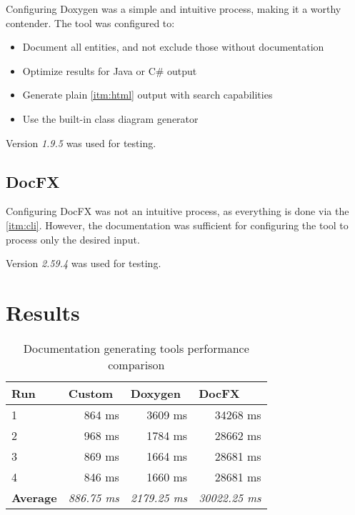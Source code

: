 Configuring Doxygen was a simple and intuitive process, making it a worthy contender. The tool was configured to:
\begin{itemize}
    \item Document all entities, and not exclude those without documentation
    \item Optimize results for Java or C\# output
    \item Generate plain \ref{itm:html} output with search capabilities
    \item Use the built-in class diagram generator
\end{itemize}

Version \textit{1.9.5} was used for testing.

\subsection{DocFX}

Configuring DocFX was not an intuitive process, as everything is done via the \ref{itm:cli}. However, the documentation was sufficient for configuring the tool to process only the desired input.

Version \textit{2.59.4} was used for testing.

\section{Results}

\begin{table}[H]
    \caption{Documentation generating tools performance comparison}
    \centering
    \label{tab:toolPerformance}
    \begin{tabular}{lrrr}
    \hline
    \textbf{Run}            & \multicolumn{1}{l}{\textbf{Custom}}    & \multicolumn{1}{l}{\textbf{Doxygen}}    & \multicolumn{1}{l}{\textbf{DocFX}}       \\ \hline
    \multicolumn{1}{|l|}{1} & \multicolumn{1}{r|}{864 ms}            & \multicolumn{1}{r|}{3609 ms}            & \multicolumn{1}{r|}{34268 ms}            \\ \hline
    \multicolumn{1}{|l|}{2} & \multicolumn{1}{r|}{968 ms}            & \multicolumn{1}{r|}{1784 ms}            & \multicolumn{1}{r|}{28662 ms}            \\ \hline
    \multicolumn{1}{|l|}{3} & \multicolumn{1}{r|}{869 ms}            & \multicolumn{1}{r|}{1664 ms}            & \multicolumn{1}{r|}{28681 ms}            \\ \hline
    \multicolumn{1}{|l|}{4} & \multicolumn{1}{r|}{846 ms}            & \multicolumn{1}{r|}{1660 ms}            & \multicolumn{1}{r|}{28681 ms}            \\ \hline
    \textbf{Average}        & \multicolumn{1}{l}{\textit{886.75 ms}} & \multicolumn{1}{l}{\textit{2179.25 ms}} & \multicolumn{1}{l}{\textit{30022.25 ms}} \\ \hline
    \end{tabular}
\end{table}


